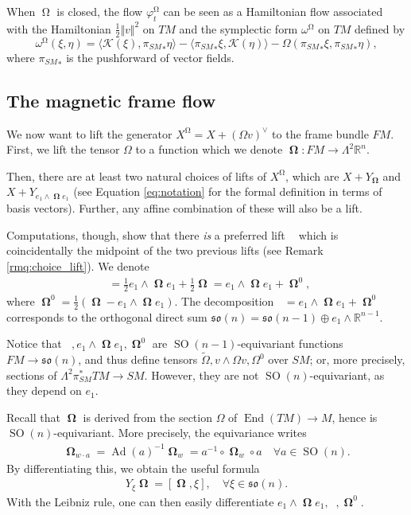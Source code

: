 \documentclass[12pt]{amsart}
\numberwithin{numbering}{section}
\theoremstyle{plain}
\theoremstyle{definition}
\theoremstyle{remark}
\numberwithin{equation}{section}
\DeclareMathOperator{\End}{End}
\DeclareMathOperator{\Ad}{Ad}
\DeclareMathOperator{\SO}{SO}
\DeclareMathOperator{\xs}{\mathbb{X}^{\mg}}
\DeclareMathOperator{\oo}{\mathbf{\Omega}}
\DeclareMathOperator{\ot}{\widetilde{\mathbf{\Omega}}}
\DeclareMathOperator{\mg}{\Omega}
\newcommand{\psm}{\pi_{SM}}
\newcommand{\R}{\mathbb{R}}
\newcommand{\frk}[1]{\mathfrak{#1}}
\begin{document}
\smallskip 

When $\mg$ is closed, the flow $\varphi_t^{\mg}$ can be seen as a Hamiltonian flow associated with the Hamiltonian $\frac{1}{2} \Vert v \Vert^2$ on $TM$ and the symplectic form $\omega^{\mg}$ on $TM$ defined by 
\[ \omega^{\mg}(\xi, \eta) = \langle \mathcal{K}(\xi), {\psm}_* \eta \rangle - \langle {\psm}_* \xi, \mathcal{K}(\eta) \rangle - \Omega ({\psm}_* \xi, {\psm}_* \eta), \]
where ${\psm}_*$ is the pushforward of vector fields.

\subsection{The magnetic frame flow} \label{sec:mag_frame_flow}

We now want to lift the generator $X^{\mg} = X + (\Omega v)^\vee$ to the frame bundle $FM$. First, we lift the tensor $\Omega$ to a function which we denote $\oo: FM \to \Lambda^2 \R^n$.

Then, there are at least two natural choices of lifts of $X^{\mg}$, which are $X + Y_{\oo}$ and $X + Y_{e_1 \wedge \oo e_1}$ (see Equation \eqref{eq:notation} for the formal definition in terms of basis vectors). Further, any affine combination of these will also be a lift. 

Computations, though, show that there \emph{is} a preferred lift $\xs$ which is coincidentally the midpoint of the two previous lifts (see Remark \ref{rmq:choice_lift}). We denote 
\begin{align}
\ot = \frac{1}{2} e_1 \wedge \oo e_1 + \frac{1}{2} \oo = e_1 \wedge \oo e_1 + \oo^0, \label{def:ot}
\end{align}
where $\oo^0 = \frac{1}{2} (\oo - e_1 \wedge \oo e_1)$. The decomposition $\ot = e_1 \wedge \oo e_1 + \oo^0$ corresponds to the orthogonal direct sum $\frk{so}(n) = \frk{so}(n-1) \oplus e_1 \wedge \R^{n-1}$. 

Notice that $\ot, e_1 \wedge \oo e_1, \oo^0$ are $\SO(n-1)$-equivariant functions $FM \to \frk{so}(n)$, and thus define tensors $\widetilde{\Omega}, v \wedge \Omega v, \Omega^0$ over $SM$; or, more precisely, sections of $\Lambda^2 \psm^* TM \to SM$. However, they are not $\SO(n)$-equivariant, as they depend on $e_1$. 

Recall that $\oo$ is derived from the section $\Omega$ of $\End(TM) \to M$, hence is $\SO(n)$-equivariant. More precisely, the equivariance writes
\begin{align*}
\oo_{w \cdot a} = \Ad(a)^{-1} \oo_w =  a^{-1} \circ \oo_w \circ a \quad \forall a \in \SO(n).
\end{align*}
By differentiating this, we obtain the useful formula 
\begin{align} \label{eq:diff_omega}
Y_\xi \oo = [\oo, \xi], \quad \forall \xi \in \frk{so}(n).
\end{align}
With the Leibniz rule, one can then easily differentiate $e_1 \wedge \oo e_1, \ot, \oo^0$.
\end{document}
